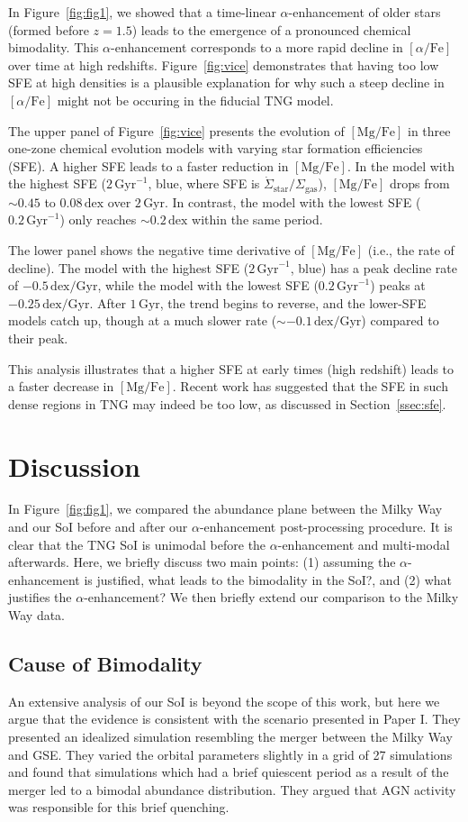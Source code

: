 \documentclass[twocolumn]{aastex631}
\newcommand{\Gyr}{\ensuremath{\textrm{Gyr}}}
\newcommand{\MgFe}{\ensuremath{[\textrm{Mg}/\textrm{Fe}]}}
\newcommand{\alphaFe}{\ensuremath{[\alpha/\textrm{Fe}]}}
\newcommand{\dex}{\ensuremath{\textrm{dex}}}
\begin{document}
In Figure~\ref{fig:fig1}, we showed that a time-linear $\alpha$-enhancement of older stars (formed before $z=1.5$) leads to the emergence of a pronounced chemical bimodality. This $\alpha$-enhancement corresponds to a more rapid decline in \alphaFe{} over time at high redshifts. Figure~\ref{fig:vice} demonstrates that having too low SFE at high densities is a plausible explanation for why such a steep decline in \alphaFe{} might not be occuring in the fiducial TNG model.

The upper panel of Figure~\ref{fig:vice} presents the evolution of \MgFe{} in three one-zone chemical evolution models with varying star formation efficiencies (SFE). A higher SFE leads to a faster reduction in \MgFe{}. In the model with the highest SFE ($2\,\Gyr^{-1}$, blue, where SFE is $\dot{\Sigma}_{\textrm{star}}/\Sigma_{\textrm{gas}}$), \MgFe{} drops from $\sim0.45$ to $0.08\,\dex$ over $2\,\Gyr$. In contrast, the model with the lowest SFE ($0.2\,\Gyr^{-1}$) only reaches $\sim0.2\,\dex$ within the same period.

The lower panel shows the negative time derivative of \MgFe{} (i.e., the rate of decline). The model with the highest SFE ($2\,\Gyr^{-1}$, blue) has a peak decline rate of $-0.5\,\dex/\Gyr$, while the model with the lowest SFE ($0.2\,\Gyr^{-1}$) peaks at $-0.25\,\dex/\Gyr$. After $1\,\Gyr$, the trend begins to reverse, and the lower-SFE models catch up, though at a much slower rate ($\sim-0.1\,\dex/\Gyr$) compared to their peak.

This analysis illustrates that a higher SFE at early times (high redshift) leads to a faster decrease in \MgFe{}. Recent work has suggested that the SFE in such dense regions in TNG may indeed be too low, as discussed in Section~\ref{ssec:sfe}.

\section{Discussion}\label{sec:disc}
In Figure~\ref{fig:fig1}, we compared the abundance plane between the Milky Way and our SoI before and after our $\alpha$-enhancement post-processing procedure. It is clear that the TNG SoI is unimodal before the $\alpha$-enhancement and multi-modal afterwards. Here, we briefly discuss two main points: (1) assuming the $\alpha$-enhancement is justified, what leads to the bimodality in the SoI?, and (2) what justifies the $\alpha$-enhancement? We then briefly extend our comparison to the Milky Way data.

\subsection{Cause of Bimodality}\label{ssec:bim_cause}
An extensive analysis of our SoI is beyond the scope of this work, but here we argue that the evidence is consistent with the scenario presented in Paper I. They presented an idealized simulation resembling the merger between the Milky Way and GSE. They varied the orbital parameters slightly in a grid of 27 simulations and found that simulations which had a brief quiescent period as a result of the merger led to a bimodal abundance distribution. They argued that AGN activity was responsible for this brief quenching.
\end{document}
